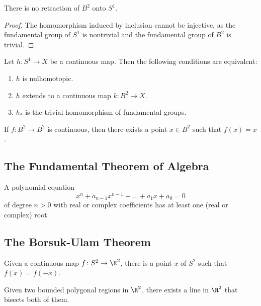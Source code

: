 \begin{theorem}
There is no retraction of $B^2$ onto $S^1$.
\end{theorem}

\begin{proof}
The homomorphism induced by inclusion cannot be injective, as the fundamental group of $S^1$ is nontrivial and the fundamental group of $B^2$ is trivial.
\end{proof}

\begin{lemma}
Let $h\colon S^1 \rightarrow X$ be a continuous map. Then the following conditions are equivalent:
\begin{enumerate}[1)]
    \item $h$ is nulhomotopic.
    \item $h$ extends to a continuous map $k\colon B^2 \rightarrow X$.
    \item $h_{\ast}$ is the trivial homomorphism of fundamental groups.
\end{enumerate}
\end{lemma}

\begin{theorem}
If $f\colon B^2 \rightarrow B^2$ is continuous, then there exists a point $x \in B^2$ such that $f(x) = x$.
\end{theorem}


\subsection{The Fundamental Theorem of Algebra}
\begin{theorem}
A polynomial equation
\[
    x^n + a_{n-1}x^{n-1} + \dots + a_1 x + a_0 = 0
\]
of degree $n > 0$ with real or complex coefficients has at least one (real or complex) root.
\end{theorem}

\subsection{The Borsuk-Ulam Theorem}

\begin{theorem}
Given a continuous map $f\colon S^2 \rightarrow \R^2$, there is a point $x$ of $S^2$ such that $f(x) = f(-x)$. 
\end{theorem}

\begin{theorem}
Given two bounded polygonal regions in $\R^2$, there exists a line in $\R^2$ that bisects both of them.
\end{theorem}

